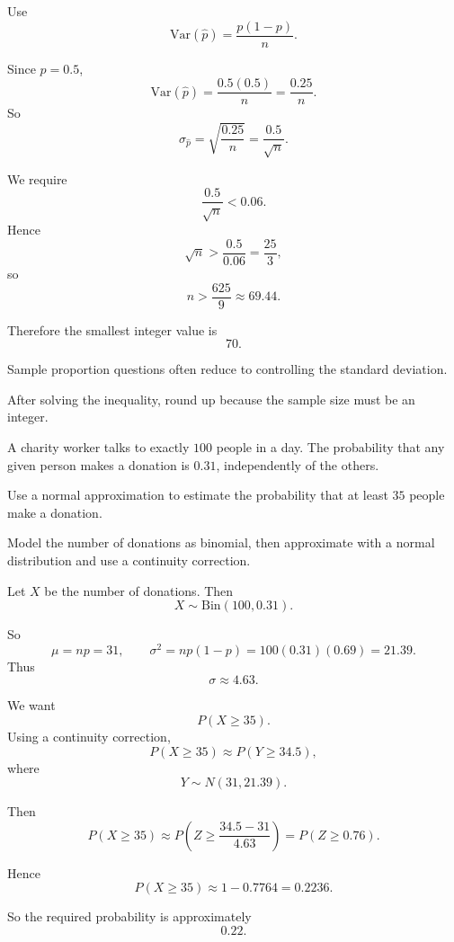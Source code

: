 \begin{hint}
Use
\[
\mathrm{Var}(\hat p)=\frac{p(1-p)}{n}.
\]
\end{hint}

\begin{solution}
Since $p=0.5$,
\[
\mathrm{Var}(\hat p)=\frac{0.5(0.5)}{n}=\frac{0.25}{n}.
\]
So
\[
\sigma_{\hat p}=\sqrt{\frac{0.25}{n}}=\frac{0.5}{\sqrt n}.
\]

We require
\[
\frac{0.5}{\sqrt n}<0.06.
\]
Hence
\[
\sqrt n>\frac{0.5}{0.06}=\frac{25}{3},
\]
so
\[
n>\frac{625}{9}\approx 69.44.
\]

Therefore the smallest integer value is
\[
\boxed{70}.
\]
\end{solution}

\begin{takeaways}
\item Sample proportion questions often reduce to controlling the standard deviation.
\item After solving the inequality, round up because the sample size must be an integer.
\end{takeaways}

\begin{problem}
A charity worker talks to exactly $100$ people in a day. The probability that any given person makes a donation is $0.31$, independently of the others.

Use a normal approximation to estimate the probability that at least $35$ people make a donation.
\end{problem}

\begin{hint}
Model the number of donations as binomial, then approximate with a normal distribution and use a continuity correction.
\end{hint}

\begin{solution}
Let $X$ be the number of donations. Then
\[
X\sim \mathrm{Bin}(100,0.31).
\]

So
\[
\mu=np=31,
\qquad
\sigma^2=np(1-p)=100(0.31)(0.69)=21.39.
\]
Thus
\[
\sigma\approx 4.63.
\]

We want
\[
P(X\ge 35).
\]
Using a continuity correction,
\[
P(X\ge 35)\approx P(Y\ge 34.5),
\]
where
\[
Y\sim N(31,21.39).
\]

Then
\[
P(X\ge 35)\approx P\left(Z\ge \frac{34.5-31}{4.63}\right)
=P(Z\ge 0.76).
\]

Hence
\[
P(X\ge 35)\approx 1-0.7764=0.2236.
\]

So the required probability is approximately
\[
\boxed{0.22}.
\]
\end{solution}


